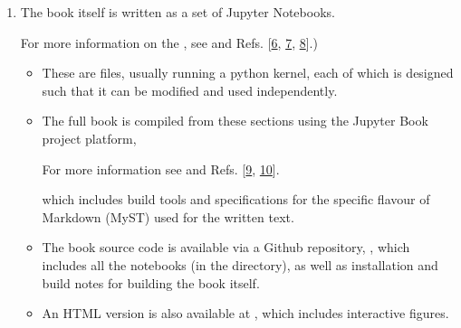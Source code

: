 \documentclass[letterpaper,table,10pt,english]{jupyterBook}
\begin{document}
\begin{enumerate}
%
\item {} 
\sphinxAtStartPar
The book itself is written as a set of Jupyter Notebooks.%
\begin{footnote}[1]\sphinxAtStartFootnote
For more information on the , see  and Refs. {[}\hyperlink{cite.backmatter/bibliography:id688}{6}, \hyperlink{cite.backmatter/bibliography:id608}{7}, \hyperlink{cite.backmatter/bibliography:id533}{8}{]}.)
%
\end{footnote}
\begin{itemize}
\item {} 
\sphinxAtStartPar
These are  files, usually running a python kernel, each of which is designed such that it can be modified and used independently.

\item {} 
\sphinxAtStartPar
The full book is compiled from these sections using the Jupyter Book project platform,%
\begin{footnote}[2]\sphinxAtStartFootnote
For more information see  and Refs. {[}\hyperlink{cite.backmatter/bibliography:id596}{9}, \hyperlink{cite.backmatter/bibliography:id470}{10}{]}.
%
\end{footnote} which includes build tools and specifications for the specific flavour of Markdown (MyST) used for the written text.

\item {} 
\sphinxAtStartPar
The book source code is available via a Github repository, , which includes all the notebooks (in the  directory), as well as installation and build notes for building the book itself.

\item {} 
\sphinxAtStartPar
An HTML version is also available at , which includes interactive figures.

\end{itemize}


\end{enumerate}
\end{document}
